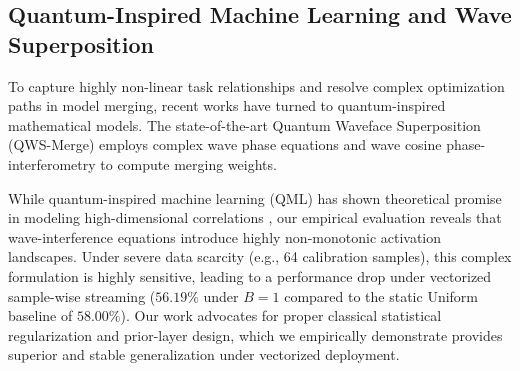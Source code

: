 \subsection{Quantum-Inspired Machine Learning and Wave Superposition}
To capture highly non-linear task relationships and resolve complex optimization paths in model merging, recent works have turned to quantum-inspired mathematical models. The state-of-the-art Quantum Waveface Superposition (QWS-Merge) \cite{qwsmerge2025} employs complex wave phase equations and wave cosine phase-interferometry to compute merging weights. 

While quantum-inspired machine learning (QML) has shown theoretical promise in modeling high-dimensional correlations \cite{biamonte2017quantum}, our empirical evaluation reveals that wave-interference equations introduce highly non-monotonic activation landscapes. Under severe data scarcity (e.g., 64 calibration samples), this complex formulation is highly sensitive, leading to a performance drop under vectorized sample-wise streaming ($56.19\%$ under $B=1$ compared to the static Uniform baseline of $58.00\%$). Our work advocates for proper classical statistical regularization and prior-layer design, which we empirically demonstrate provides superior and stable generalization under vectorized deployment.
